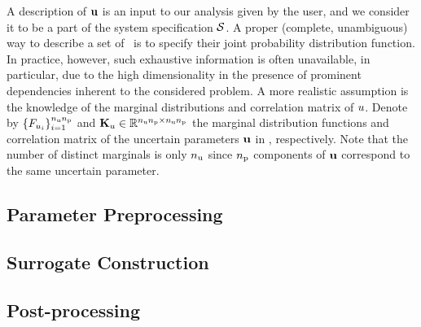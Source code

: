 A description of $\mathbf{u}$ is an input to our analysis given by the user, and we consider it to be a part of the system specification $\mathcal{S}$.
A proper (complete, unambiguous) way to describe a set of \rvs\ is to specify their joint probability distribution function.
In practice, however, such exhaustive information is often unavailable, in particular, due to the high dimensionality in the presence of prominent dependencies inherent to the considered problem.
A more realistic assumption is the knowledge of the marginal distributions and correlation matrix of $u$.
Denote by $\{ F_{u_i} \}_{i = 1}^{{n_\text{u}} {n_\text{p}}}$ and $\mathbf{K}_u \in \mathbb{R}^{{n_\text{u}} {n_\text{p}} \times {n_\text{u}} {n_\text{p}}}$ the marginal distribution functions and correlation matrix of the uncertain parameters $\mathbf{u}$ in , respectively.
Note that the number of distinct marginals is only ${n_\text{u}}$ since ${n_\text{p}}$ components of $\mathbf{u}$ correspond to the same uncertain parameter.

\subsection{Parameter Preprocessing} 


\subsection{Surrogate Construction}


\subsection{Post-processing} 

